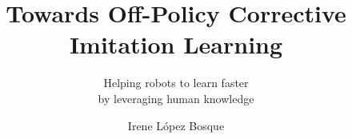 \documentclass{layout/tudelft-report}
\begin{document}
\frontmatter

\title{Towards Off-Policy Corrective Imitation Learning}
\subtitle{Helping robots to learn faster \\ by leveraging human knowledge} %
\author{Irene López Bosque}
\subject{Master Thesis}


\makecover








\tableofcontents

%

\mainmatter














\setcounter{biburlnumpenalty}{7000}
\setcounter{biburllcpenalty}{7000}
\setcounter{biburlucpenalty}{7000}

\printbibliography[title=References]

\appendix




\end{document}
